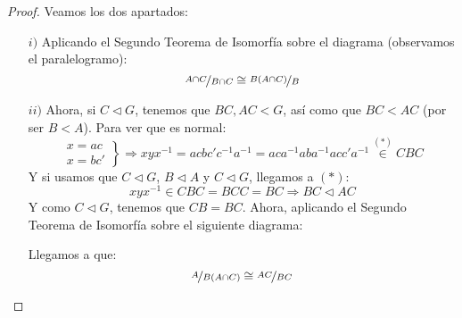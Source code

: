 \begin{lema}
    \begin{proof}
        Veamos los dos apartados:
        \begin{enumerate}
            \item[$i)$] Aplicando el Segundo Teorema de Isomorfía sobre el diagrama (observamos el paralelogramo):
                \begin{equation*}
                    \nicefrac{A\cap C}{B\cap C} \cong \nicefrac{B(A\cap C)}{B}
                \end{equation*}
            \item[$ii)$] Ahora, si $C\lhd G$, tenemos que $BC,AC<G$, así como que $BC<AC$ (por ser $B<A$). Para ver que es normal:
                \begin{equation*}
                    \left.\begin{array}{l}
                        x = ac \\
                        x = bc'
                \end{array}\right\} \Longrightarrow xyx^{-1} = acbc'c^{-1}a^{-1} = aca^{-1}aba^{-1}acc'a^{-1} \stackrel{(\ast)}{\in} CBC
                \end{equation*}
                Y si usamos que $C\lhd G$, $B\lhd A$ y $C\lhd G$, llegamos a $(\ast)$:
                \begin{equation*}
                    xyx^{-1} \in CBC = BCC = BC \Longrightarrow BC \lhd AC
                \end{equation*}
                Y como $C\lhd G$, tenemos que $CB = BC$. Ahora, aplicando el Segundo Teorema de Isomorfía sobre el siguiente diagrama:

                \begin{figure}[H]
                    \centering
                \end{figure}
                Llegamos a que:
                \begin{equation*}
                    \nicefrac{A}{B(A\cap C)} \cong \nicefrac{AC}{BC}
                \end{equation*}
        \end{enumerate}
    \end{proof}
\end{lema}

